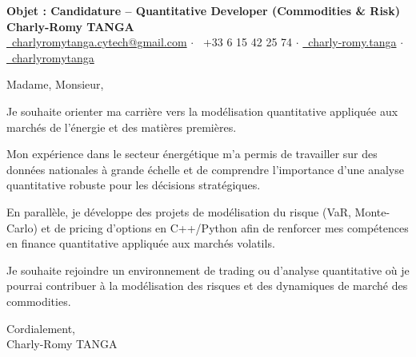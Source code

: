 \documentclass[10pt, letterpaper]{article}
\begin{document}
\begin{center}
\textbf{\LARGE Objet : Candidature -- Quantitative Developer (Commodities \& Risk)}\\[0.2cm]
\textbf{\large Charly-Romy TANGA}\\[0.2cm]
\href{mailto:charlyromytanga.cytech@gmail.com}{\faEnvelope\ charlyromytanga.cytech@gmail.com} \quad$\cdot$\quad
\faPhone\ +33 6 15 42 25 74 \quad$\cdot$\quad
\href{https://www.linkedin.com/in/charly-romy-tanga}{\faLinkedin\ charly-romy.tanga} \quad$\cdot$\quad
\href{https://github.com/charlyromytanga}{\faGithub\ charlyromytanga}
\end{center}
Madame, Monsieur,

Je souhaite orienter ma carrière vers la modélisation quantitative appliquée aux marchés de l'énergie et des matières premières.

Mon expérience dans le secteur énergétique m'a permis de travailler sur des données nationales à grande échelle et de comprendre l'importance d'une analyse quantitative robuste pour les décisions stratégiques.

En parallèle, je développe des projets de modélisation du risque (VaR, Monte-Carlo) et de pricing d'options en C++/Python afin de renforcer mes compétences en finance quantitative appliquée aux marchés volatils.

Je souhaite rejoindre un environnement de trading ou d'analyse quantitative où je pourrai contribuer à la modélisation des risques et des dynamiques de marché des commodities.

Cordialement,\\
Charly-Romy TANGA
\end{document}
